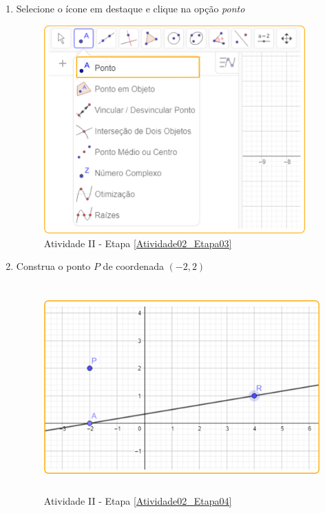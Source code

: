 \documentclass[11pt,a4paper]{article}
\begin{document}
\begin{enumerate}[{Etapa} 1.]
\item Selecione o ícone em destaque e clique na opção {\it ponto} \label{Atividade02_Etapa03}
\begin{figure}[H]
    \centering
    \includegraphics[height=8cm]{Figuras/T01_Elemento01.png}
    \caption{Atividade II - Etapa \ref{Atividade02_Etapa03}}
    \label{Atividade02_Etapa03_Imagem}
\end{figure}

\item Construa o ponto $P$ de coordenada $(-2,2)$ \label{Atividade02_Etapa04}
\begin{figure}[H]
    \centering
    \includegraphics[height=8cm]{Figuras/T01_Atividade02_Fig02.png}
    \caption{Atividade II - Etapa \ref{Atividade02_Etapa04}}
    \label{Atividade02_Etapa04_Imagem}
\end{figure}


\end{enumerate}
\end{document}
